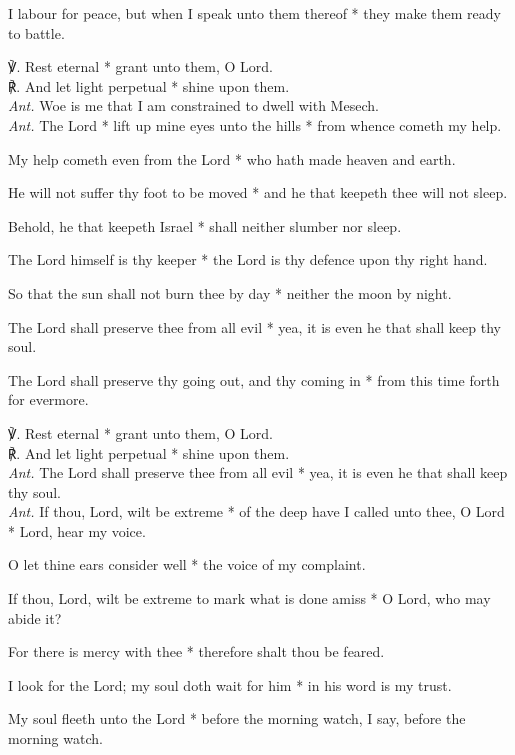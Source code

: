 I labour for peace, but when I speak unto them thereof * they make them ready to battle.\\
\par\noindent
℣. Rest eternal * grant unto them, O Lord.\\
℟. And let light perpetual * shine upon them.\\
\textit{Ant.} Woe is me that I am constrained to dwell with Mesech.\\
\textit{Ant.} The Lord *
 lift up mine eyes unto the hills * from whence cometh my help.
\par
My help cometh even from the Lord * who hath made heaven and earth.
\par
He will not suffer thy foot to be moved * and he that keepeth thee will not sleep.
\par
Behold, he that keepeth Israel * shall neither slumber nor sleep.
\par
The Lord himself is thy keeper * the Lord is thy defence upon thy right hand.
\par
So that the sun shall not burn thee by day * neither the moon by night.
\par
The Lord shall preserve thee from all evil * yea, it is even he that shall keep thy soul.
\par
The Lord shall preserve thy going out, and thy coming in * from this time forth for evermore.\\
\par\noindent
℣. Rest eternal * grant unto them, O Lord.\\
℟. And let light perpetual * shine upon them.\\
\textit{Ant.} The Lord shall preserve thee from all evil * yea, it is even he that shall keep thy soul.\\
\textit{Ant.} If thou, Lord, wilt be extreme *
 of the deep have I called unto thee, O Lord * Lord, hear my voice.
\par
O let thine ears consider well * the voice of my complaint.
\par
If thou, Lord, wilt be extreme to mark what is done amiss * O Lord, who may abide it?
\par
For there is mercy with thee * therefore shalt thou be feared.
\par
I look for the Lord; my soul doth wait for him * in his word is my trust.
\par
My soul fleeth unto the Lord * before the morning watch, I say, before the morning watch.
